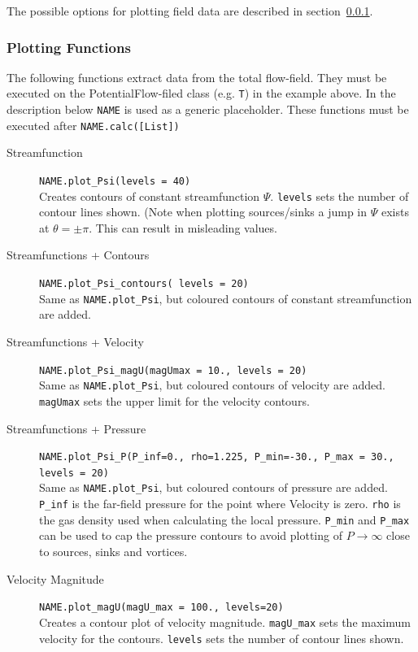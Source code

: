 \documentclass[10pt,a4paper]{article}
\begin{document}
The possible options for plotting field data are described in section~\ref{S_plotting}.

\subsubsection{Plotting Functions}\label{S_plotting}
The following functions extract data from the total flow-field.
They must be executed on the PotentialFlow-filed class (e.g. \verb'T') in the example above.  
In the description below \verb'NAME' is used as a generic placeholder. 
These functions must be executed after \verb'NAME.calc([List])'



\begin{description}
\item[Streamfunction] \verb'NAME.plot_Psi(levels = 40)' \\
Creates contours of constant streamfunction $\Psi$. 
\verb'levels' sets the number of contour lines shown.
(Note when plotting sources/sinks a jump in $\Psi$ exists at $\theta = \pm \pi$. 
This can result in misleading values.

\item[Streamfunctions + Contours] \verb'NAME.plot_Psi_contours( levels = 20)'\\
Same as \verb'NAME.plot_Psi', but coloured contours of constant streamfunction are added.

\item[Streamfunctions + Velocity] \verb'NAME.plot_Psi_magU(magUmax = 10., levels = 20)'\\
Same as \verb'NAME.plot_Psi', but coloured contours of velocity are added. 
\verb'magUmax' sets the upper limit for the velocity contours.

\item[Streamfunctions + Pressure] \verb'NAME.plot_Psi_P(P_inf=0., rho=1.225, P_min=-30., P_max = 30., levels = 20)'\\
Same as \verb'NAME.plot_Psi', but coloured contours of pressure are added. 
\verb'P_inf' is the far-field pressure for the point where Velocity is zero. 
\verb'rho' is the gas density used when calculating the local pressure.
\verb'P_min' and \verb'P_max' can be used to cap the pressure contours to avoid plotting of $P\rightarrow \infty$ close to sources, sinks and vortices. 

\item[Velocity Magnitude] \verb'NAME.plot_magU(magU_max = 100., levels=20)'\\
Creates a contour plot of velocity magnitude. 
\verb'magU_max' sets the maximum velocity for the contours. 
\verb'levels' sets the number of contour lines shown.


\end{description}
\end{document}

